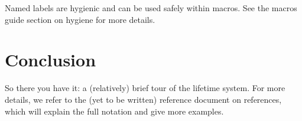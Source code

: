 \documentclass[]{article}
\begin{document}
Named labels are hygienic and can be used safely within macros. See the
macros guide section on hygiene for more details.

\section{Conclusion}\label{conclusion}

So there you have it: a (relatively) brief tour of the lifetime system.
For more details, we refer to the (yet to be written) reference document
on references, which will explain the full notation and give more
examples.
\end{document}
